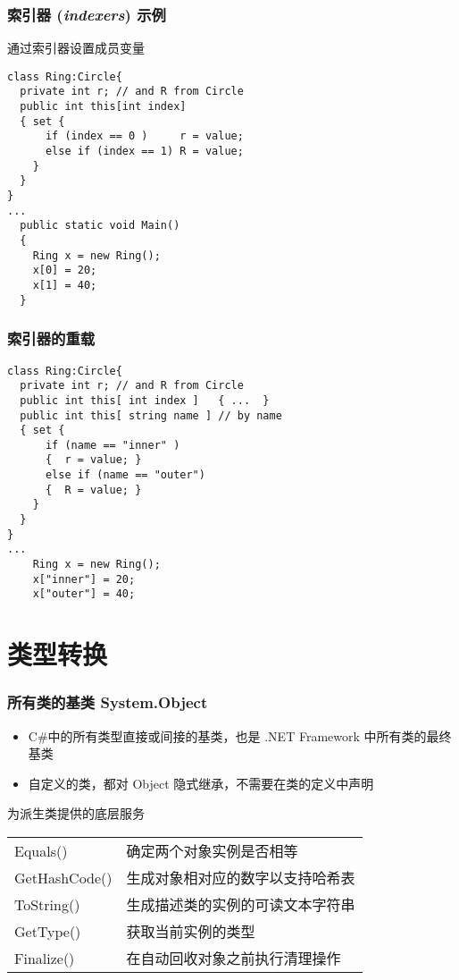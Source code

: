 \begin{frame}[fragile]
\frametitle{索引器 (\textit{indexers}) 示例}
通过索引器设置成员变量
\begin{lstlisting}
class Ring:Circle{
  private int r; // and R from Circle
  public int this[int index]
  { set {
      if (index == 0 )     r = value;
      else if (index == 1) R = value;
    }
  }
}
...
  public static void Main()
  {
    Ring x = new Ring();
    x[0] = 20;
    x[1] = 40;
  }
\end{lstlisting}
\end{frame}

\begin{frame}[fragile]
\frametitle{索引器的重载}
\begin{lstlisting}
class Ring:Circle{
  private int r; // and R from Circle
  public int this[ int index ]   { ...  }
  public int this[ string name ] // by name
  { set {
      if (name == "inner" )
      {  r = value; }
      else if (name == "outer")
      {  R = value; }
    }
  }
}
...
    Ring x = new Ring();
    x["inner"] = 20;
    x["outer"] = 40;
\end{lstlisting}


\end{frame}

\section{类型转换}

\begin{frame}
\frametitle{所有类的基类 System.Object}
\begin{itemize}
\item C\#中的所有类型直接或间接的基类，也是 .NET Framework 中所有类的最终基类
\item 自定义的类，都对 Object 隐式继承，不需要在类的定义中声明
\end{itemize}
\pause
\begin{block}{为派生类提供的底层服务}
  \begin{tabular}{l|l}
    Equals()      & 确定两个对象实例是否相等         \\
    GetHashCode() & 生成对象相对应的数字以支持哈希表 \\
    ToString()    & 生成描述类的实例的可读文本字符串 \\
    GetType()     & 获取当前实例的类型               \\
    Finalize()    & 在自动回收对象之前执行清理操作   \\
  \end{tabular}
  \normalfont
\end{block}
\end{frame}


